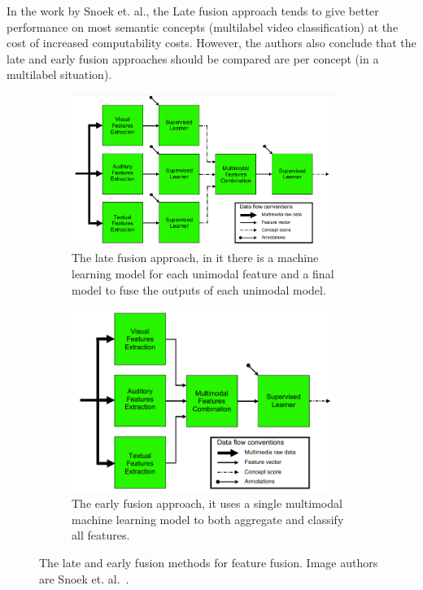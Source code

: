 In the work by Snoek et. al.\cite{snoek2005featurefusion}, the Late fusion approach tends to give better performance on most semantic concepts (multilabel video classification) at the cost of increased computability costs. However, the authors also conclude that the late and early fusion approaches should be compared are per concept (in a multilabel situation).%

\begin{figure}[!ht]
    \centering
    \begin{subfigure}[b]{0.55\textwidth}
        \includegraphics[width=0.94\textwidth]{img/late-fusion.png}
        \caption{The late fusion approach, in it there is a machine learning model for each unimodal feature and a final model to fuse the outputs of each unimodal model.}
        \label{fig:early-fusion}
    \end{subfigure}
    \begin{subfigure}[b]{0.44\textwidth}
        \includegraphics[width=0.94\textwidth]{img/early-fusion.png}
        \caption{The early fusion approach, it uses a single multimodal machine learning model to both aggregate and classify all features.}
        \label{fig:late-fusion}
    \end{subfigure}
    \caption{The late and early fusion methods for feature fusion. Image authors are Snoek et. al.~\cite{snoek2005featurefusion}.}
\end{figure}

